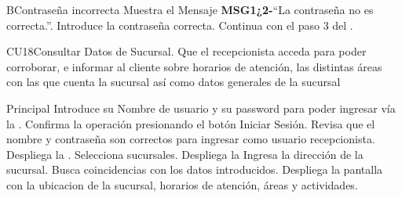 		\begin{UCtrayectoriaA}{B}{Contraseña incorrecta}
			\UCpaso Muestra el Mensaje {\bf MSG1¿2-}``La contraseña no es correcta.''.
			\UCpaso[\UCactor] Introduce la contraseña correcta.
			\UCpaso[] Continua con el paso 3 del .
		\end{UCtrayectoriaA}


		

\begin{UseCase}{CU18}{Consultar Datos de Sucursal.}{
			Que el recepcionista acceda para poder corroborar, e informar al cliente sobre horarios de atención, las distintas áreas con
las que cuenta la sucursal así como datos generales de la sucursal}
	\end{UseCase}
	\begin{UCtrayectoria}{Principal}
		\UCpaso[\UCactor] Introduce su Nombre de usuario y su password para poder ingresar vía la  \label{CU1LoginJI}.
		\UCpaso[\UCactor] Confirma la operación presionando el botón Iniciar Sesión.
		\UCpaso Revisa que el nombre y contraseña son correctos para ingresar como usuario recepcionista.
		\UCpaso Despliega la .
		\UCpaso[\UCactor]Selecciona sucursales.
		\UCpaso Despliega la 
		\UCpaso[\UCactor]Ingresa la dirección de la sucursal.
		\UCpaso Busca coincidencias con los datos introducidos.
		\UCpaso Despliega la pantalla con la ubicacion de la sucursal, horarios de atención, áreas y actividades.

	\end{UCtrayectoria}

